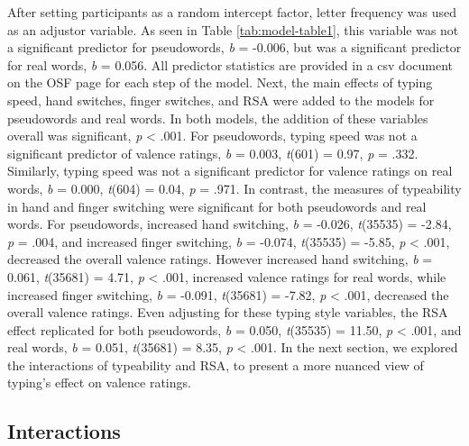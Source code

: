 \documentclass[
  english,
  man]{apa7}
\begin{document}
After setting participants as a random intercept factor, letter frequency was used as an adjustor variable. As seen in Table \ref{tab:model-table1}, this variable was not a significant predictor for pseudowords, \emph{b} = -0.006, but was a significant predictor for real words, \emph{b} = 0.056. All predictor statistics are provided in a csv document on the OSF page for each step of the model. Next, the main effects of typing speed, hand switches, finger switches, and RSA were added to the models for pseudowords and real words. In both models, the addition of these variables overall was significant, \emph{p} \textless{} .001. For pseudowords, typing speed was not a significant predictor of valence ratings, \emph{b} = 0.003, \emph{t}(601) = 0.97, \emph{p} = .332. Similarly, typing speed was not a significant predictor for valence ratings on real words, \emph{b} = 0.000, \emph{t}(604) = 0.04, \emph{p} = .971. In contrast, the measures of typeability in hand and finger switching were significant for both pseudowords and real words. For pseudowords, increased hand switching, \emph{b} = -0.026, \emph{t}(35535) = -2.84, \emph{p} = .004, and increased finger switching, \emph{b} = -0.074, \emph{t}(35535) = -5.85, \emph{p} \textless{} .001, decreased the overall valence ratings. However increased hand switching, \emph{b} = 0.061, \emph{t}(35681) = 4.71, \emph{p} \textless{} .001, increased valence ratings for real words, while increased finger switching, \emph{b} = -0.091, \emph{t}(35681) = -7.82, \emph{p} \textless{} .001, decreased the overall valence ratings. Even adjusting for these typing style variables, the RSA effect replicated for both pseudowords, \emph{b} = 0.050, \emph{t}(35535) = 11.50, \emph{p} \textless{} .001, and real words, \emph{b} = 0.051, \emph{t}(35681) = 8.35, \emph{p} \textless{} .001. In the next section, we explored the interactions of typeability and RSA, to present a more nuanced view of typing's effect on valence ratings.

\hypertarget{interactions}{%
\subsection{Interactions}\label{interactions}}
\end{document}
